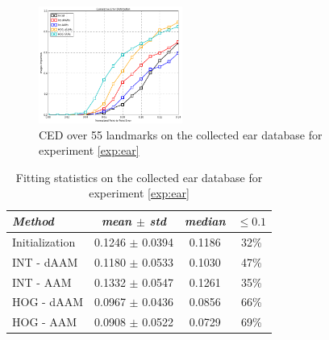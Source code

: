 \begin{figure}[t!]
\centering
\includegraphics[width=0.42\textwidth]{resources/Fig_Alignment/ear_ced}
\caption{CED over 55 landmarks on the collected ear database for experiment \ref{exp:ear}}
\label{fig:ear_ced}
\end{figure}

\begin{table}[t]
\small
\centering
\begin{tabular}{|l|c|c|c|}
\hline
\emph{Method}   & \emph{mean $\pm$ std} & \emph{median} & $\leq 0.1$\\
\hline\hline
Initialization  & 0.1246 $\pm$ 0.0394 & 0.1186 & 32\%\\
INT - dAAM      & 0.1180 $\pm$ 0.0533 & 0.1030 & 47\%\\
INT - AAM       & 0.1332 $\pm$ 0.0547 & 0.1261 & 35\%\\
HOG - dAAM      & 0.0967 $\pm$ 0.0436 & 0.0856 & 66\%\\
HOG - AAM       & 0.0908 $\pm$ 0.0522 & 0.0729 & 69\%\\
\hline
\end{tabular}
\caption{Fitting statistics on the collected ear database for experiment \ref{exp:ear}}
\label{tab:ear_stats}
\end{table}




